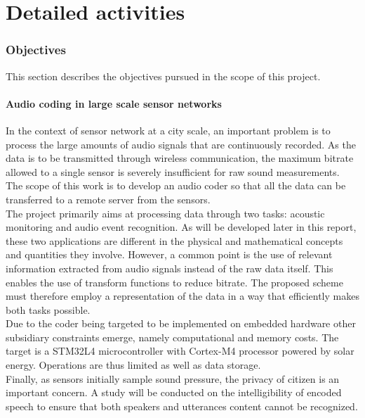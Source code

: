 \documentclass[12pt,times,onecolumn]{article}
\begin{document}
\clearpage

\part{Detailed activities}
\setcounter{section}{0}
\section{Objectives}
This section describes the objectives pursued in the scope of this project.
\subsection{Audio coding in large scale sensor networks}
In the context of sensor network at a city scale, an important problem is to process the large amounts of audio signals that are continuously recorded. As the data is to be transmitted through wireless communication, the maximum bitrate allowed to a single sensor is severely insufficient for raw sound measurements. The scope of this work is to develop an audio coder so that all the data can be transferred to a remote server from the sensors.\\

The project primarily aims at processing data through two tasks: acoustic monitoring and audio event recognition. As will be developed later in this report, these two applications are different in the physical and mathematical concepts and quantities they involve. However, a common point is the use of relevant information extracted from audio signals instead of the raw data itself. This enables the use of transform functions to reduce bitrate. The proposed scheme must therefore employ a representation of the data in a way that efficiently makes both tasks possible.\\

Due to the coder being targeted to be implemented on embedded hardware other subsidiary constraints emerge, namely computational and memory costs. The target is a STM32L4 microcontroller with Cortex-M4 processor powered by solar energy. Operations are thus limited as well as data storage.\\

Finally, as sensors initially sample sound pressure, the privacy of citizen is an important concern. A study will be conducted on the intelligibility of encoded speech to ensure that both speakers and utterances content cannot be recognized.\\
\end{document}
